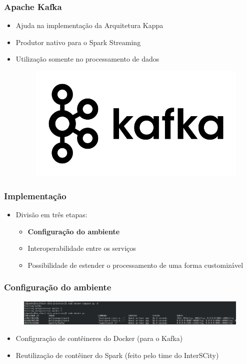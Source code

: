 \documentclass{beamer}
\begin{document}
  \begin{frame}
      \frametitle{Apache Kafka}
      \begin{itemize}
          \item Ajuda na implementação da Arquitetura Kappa
          \item Produtor nativo para o Spark Streaming
          \item Utilização somente no processamento de dados
              \begin{figure}
                  \includegraphics[scale=0.3]{figures/kafka_logo.png}
              \end{figure}
      \end{itemize}
  \end{frame}

  \begin{frame}
      \frametitle{Implementação}
      \begin{itemize}
          \item Divisão em três etapas:
              \begin{itemize}
                  \item \textbf{Configuração do ambiente}
                  \item Interoperabilidade entre os serviços
                  \item Possibilidade de estender o processamento de uma forma customizável
              \end{itemize}
      \end{itemize}
  \end{frame}

  \begin{frame}
      \frametitle{Configuração do ambiente}
      \begin{figure}
          \includegraphics[scale=0.3]{figures/KafkaDocker.png}
      \end{figure}
      \begin{itemize}
          \item Configuração de contêineres do Docker (para o Kafka)
          \item Reutilização de contêiner do Spark (feito pelo time do InterSCity)
      \end{itemize}
  \end{frame}
\end{document}
